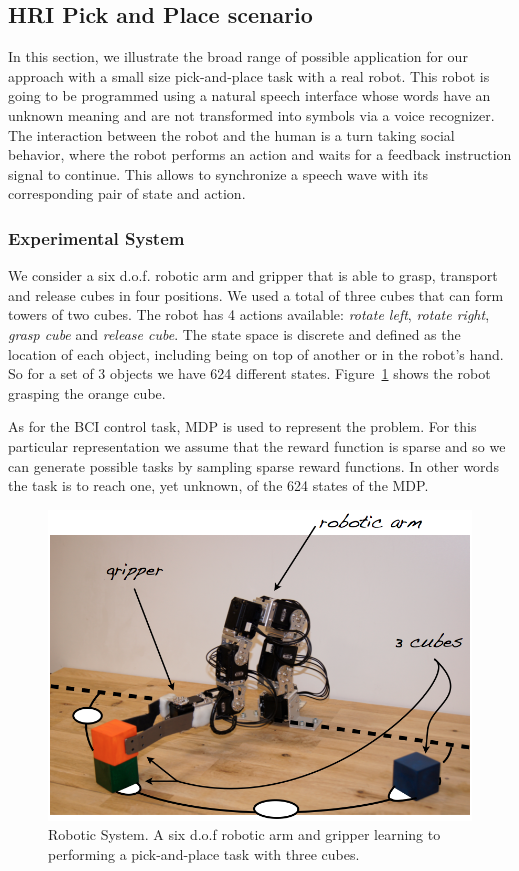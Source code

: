 \documentclass[conference]{IEEEtran}
\begin{document}
\subsection{HRI Pick and Place scenario}

In this section, we illustrate the broad range of possible application for our approach with a small size pick-and-place task with a real robot. This robot is going to be programmed using a natural speech interface whose words have an unknown meaning and are not transformed into symbols via a voice recognizer. The interaction between the robot and the human is a turn taking social behavior, where the robot performs an action and waits for a feedback instruction signal to continue. This allows to synchronize a speech wave with its corresponding pair of state and action. 

\subsubsection{Experimental System}

We consider a six d.o.f. robotic arm and gripper that is able to grasp, transport and release cubes in four positions. We used a total of three cubes that can form towers of two cubes.  The robot has 4 actions available: \textit{rotate left}, \textit{rotate right}, \textit{grasp cube} and \textit{release cube}. The state space is discrete and defined as the location of each object, including being on top of another or in the robot's hand. So for a set of 3 objects we have 624 different states. Figure~\ref{setup} shows the robot grasping the orange cube. 

As for the BCI control task, MDP is used to represent the problem. For this particular representation we assume that the reward function is sparse and so we can generate possible tasks by sampling sparse reward functions. In other words the task is to reach one, yet unknown, of the 624 states of the MDP.

\begin{figure}[!t]
	\centering
		\includegraphics[width=0.7\columnwidth]{images/setup4.png}
	\caption{Robotic System. A six d.o.f robotic arm and gripper learning to performing a pick-and-place task with three cubes.}
	\label{setup}
\end{figure}
\end{document}
